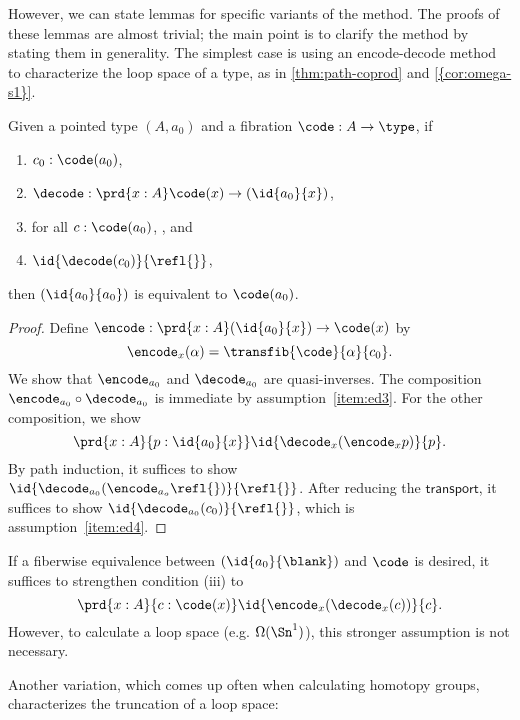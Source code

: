However, we can state lemmas for specific variants of the method.
The proofs of these lemmas are almost trivial; the main point is to
clarify the method by stating them in generality.  The simplest
case is using an encode-decode method to characterize the loop space of a
type, as in \cref{thm:path-coprod} and \cref{{cor:omega-s1}}.

\begin{lem}\label{lem:encode-decode-loop}
Given a pointed type $(A,a_0)$ and a fibration
$\code : A \to \type$, if
\begin{enumerate}
\item $c_0 : \code(a_0)$,\label{item:ed1}
\item $\decode : \prd{x:A} \code(x) \to (\id{a_0}{x})$,\label{item:ed2}
\item for all $c : \code(a_0)$, , and\label{item:ed3}
\item $\id{\decode(c_0)}{\refl{}}$,\label{item:ed4}
\end{enumerate}
then $(\id{a_0}{a_0})$ is equivalent to $\code(a_0)$.
\end{lem}

\begin{proof}
Define
$\encode : \prd{x:A} (\id{a_0}{x}) \to \code(x)$ by
\[
\encode_x(\alpha) = \transfib{\code}{\alpha}{c_0}.
\]
We show that $\encode_{a_0}$ and $\decode_{a_0}$ are quasi-inverses.
The composition $\encode_{a_0} \circ \decode_{a_0}$ is immediate by
assumption~\ref{item:ed3}.  For the other composition, we show
\[
\prd{x:A}{p : \id{a_0}{x}} \id{\decode_{x} (\encode_{x} p)}{p}.
\]
By path induction, it suffices to show
$\id{{\decode_{{a_0}} (\encode_{{a_o}} \refl{})}}{\refl{}}$.
After reducing the $\mathsf{transport}$, it suffices to show
$\id{{\decode_{{a_0}} (c_0)}}{\refl{}}$, which is assumption~\ref{item:ed4}.
\end{proof}

If a fiberwise equivalence between $(\id{a_0}{\blank})$ and $\code$ is desired,
it suffices to strengthen condition (iii) to
\[
\prd{x:A}{c : \code(x)} \id{\encode_{x}(\decode_{x}(c))}{c}.
\]
However, to calculate a loop space (e.g. $\Omega(\Sn ^1)$), this
stronger assumption is not necessary.

Another variation, which comes up often when calculating homotopy
groups, characterizes the truncation of a loop space:


